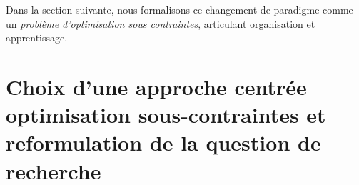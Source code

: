 \documentclass[ twoside,openright,titlepage,numbers=noenddot,headinclude,%
                footinclude=true,cleardoublepage=empty,abstractoff, %
                BCOR=5mm,paper=a4,fontsize=11pt,%
                french,american,%
                ]{scrreprt}
\begin{document}
Dans la section suivante, nous formalisons ce changement de paradigme comme un \textit{problème d'optimisation sous contraintes}, articulant organisation et apprentissage.


\section{Choix d'une approche centrée optimisation sous-contraintes et reformulation de la question de recherche}\label{sec:constrained-formulation}

\end{document}
